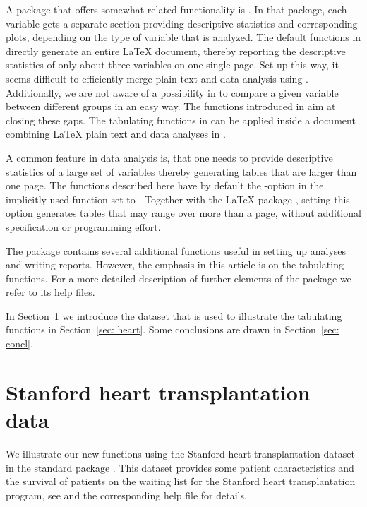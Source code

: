 \documentclass[nojss]{jss}
\begin{document}
A package that offers somewhat related functionality is  \citep{r2lUniv}.
In that package, each variable gets a separate section providing descriptive statistics and corresponding plots, 
depending on the type of variable that is analyzed. The default functions in 
directly generate an entire {\LaTeX} document, thereby reporting the descriptive statistics of only about three variables
on one single page. Set up this way, it seems difficult to efficiently merge plain text and data analysis using .
Additionally, we are not aware of a possibility in  to compare a given variable between different groups in an
easy way. The functions introduced in  aim at closing these gaps. The tabulating functions 
in  can be applied inside a  document combining {\LaTeX} plain text and data 
analyses in .

A common feature in data analysis is, that one needs to provide descriptive statistics of a large set of variables thereby
generating tables that are larger than one page. The functions described here have by default 
the -option
in the implicitly used  function  set to . Together
with the {\LaTeX} package , setting this option generates tables that may range over more than a 
page, without additional specification or programming effort.

The package  contains several additional functions useful in setting up analyses and 
writing reports. However, the emphasis in this article is on the tabulating functions. For a more detailed description
of further elements of the package we refer to its  help files.

In Section~\ref{sec: data} we introduce the dataset that is used to illustrate the tabulating functions 
in Section~\ref{sec: heart}. Some conclusions are drawn in Section~\ref{sec: concl}.

\section{Stanford heart transplantation data} \label{sec: data}
We illustrate our new functions using the Stanford heart transplantation dataset  in the 
standard  package  \citep{survival}. 
This dataset provides some patient characteristics and the survival of patients on the waiting list for the 
Stanford heart transplantation program, see \cite{crowley_77} and the corresponding  help file for details.
\end{document}
